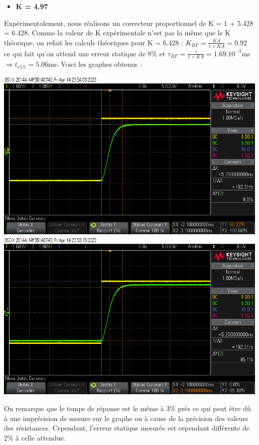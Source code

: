 \documentclass[12pt]{article}
\begin{document}
\newpage \begin{itemize}
\item \bf \large K = 4.97
\end{itemize}
Expérimentalement, nous réalisons un correcteur proportionnel de K = 1 + 5.428 = 6.428.
Comme la valeur de K expérimentale n'est pas la même que le K théorique, on refait les calculs théoriques pour K = 6.428 :
$K_{BF} = \frac{KA}{1+KA}  = 0.92$ ce qui fait qu'on attend une erreur statique de 8$\%$ et $\tau_{BF} = \frac{\tau}{1 + KA} = 1.69.10^{-3}$ms $\Rightarrow t_{r5\%} = 5.06$ms.
Voici les graphes obtenus :
\begin{center}
    \includegraphics[width = 16 cm]{TP3/Syst_1/P/14_04_2023_es_k5.png}
    \includegraphics[width = 16 cm]{TP3/Syst_1/P/14_04_2023_tr_k5.png}
\end{center}
On remarque que le temps de réponse est le même à 3$\%$ près ce qui peut être dû à une imprécision de mesure sur le graphe ou à cause de la précision des valeurs des résistances. Cependant, l'erreur statique mesurée est cependant différente de 2$\%$ à celle attendue.
\end{document}
